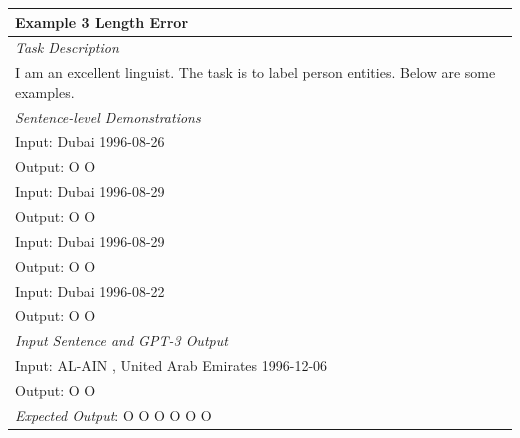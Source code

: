 \documentclass{article}
\begin{document}
\begin{table}[th!]
{\begin{tabular}{l}
\textbf{Example 3 {\color{red} Length Error}} \\\midrule
       	\textit{Task Description} \\
I am an excellent linguist. The task is to label person entities. Below are some examples. \\\midrule
\textit{Sentence-level Demonstrations} \\
Input: Dubai 1996-08-26 \\
Output: O O \\
Input: Dubai 1996-08-29 \\
Output: O O \\
Input: Dubai 1996-08-29 \\
Output: O O \\
Input: Dubai 1996-08-22 \\
Output: O O \\\midrule
\textit{Input Sentence and GPT-3 Output} \\
Input: AL-AIN , United Arab Emirates 1996-12-06 \\
Output: O O \\
{\color{blue}\it Expected Output}: O O O O O O \\\bottomrule


\end{tabular}}
\end{table}
\end{document}
